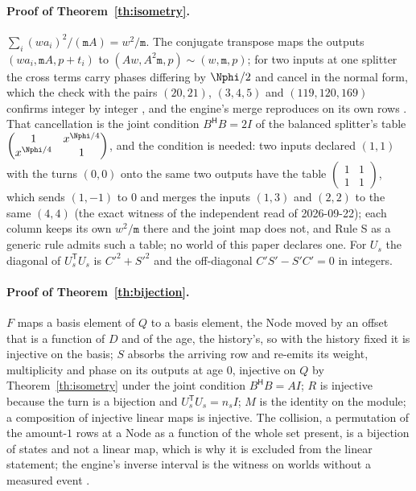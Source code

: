 \paragraph{Proof of Theorem~\ref{th:isometry}.} $\sum_i (wa_i)^2/(\mathtt m A) = w^2/\mathtt m$. The conjugate transpose maps the outputs $(wa_i, \mathtt m A, p + t_i)$ to $(Aw, A^2 \mathtt m, p) \sim (w, \mathtt m, p)$; for two inputs at one splitter the cross terms carry phases differing by $\Nphi/2$ and cancel in the normal form, which the check with the pairs $(20, 21)$, $(3, 4, 5)$ and $(119, 120, 169)$ confirms integer by integer \cite{design}, and the engine's merge reproduces on its own rows \cite{beamlaw}. That cancellation is the joint condition $B^{\mathsf H} B = 2I$ of the balanced splitter's table $\begin{pmatrix} 1 & x^{\Nphi/4} \\ x^{\Nphi/4} & 1 \end{pmatrix}$, and the condition is needed: two inputs declared $(1, 1)$ with the turns $(0, 0)$ onto the same two outputs have the table $\begin{pmatrix} 1 & 1 \\ 1 & 1 \end{pmatrix}$, which sends $(1, -1)$ to $0$ and merges the inputs $(1, 3)$ and $(2, 2)$ to the same $(4, 4)$ (the exact witness of the independent read of 2026-09-22); each column keeps its own $w^2/\mathtt m$ there and the joint map does not, and Rule S as a generic rule admits such a table; no world of this paper declares one. For $U_s$ the diagonal of $U_s^{\mathsf T}U_s$ is $C'^2 + S'^2$ and the off-diagonal $C'S' - S'C' = 0$ in integers.

\paragraph{Proof of Theorem~\ref{th:bijection}.} $F$ maps a basis element of $Q$ to a basis element, the Node moved by an offset that is a function of $D$ and of the age, the history's, so with the history fixed it is injective on the basis; $S$ absorbs the arriving row and re-emits its weight, multiplicity and phase on its outputs at age $0$, injective on $Q$ by Theorem~\ref{th:isometry} under the joint condition $B^{\mathsf H} B = A I$; $R$ is injective because the turn is a bijection and $U_s^{\mathsf T}U_s = n_s I$; $M$ is the identity on the module; a composition of injective linear maps is injective. The collision, a permutation of the amount-$1$ rows at a Node as a function of the whole set present, is a bijection of states and not a linear map, which is why it is excluded from the linear statement; the engine's inverse interval is the witness on worlds without a measured event \cite{beamlaw}.


